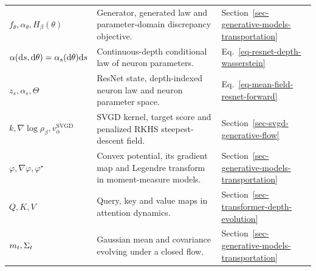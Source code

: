{\begin{longtable}{>{\raggedright\arraybackslash}p{}
                  >{\raggedright\arraybackslash}p{}
                  >{\raggedright\arraybackslash}p{}}
$f_\theta,\alpha_\theta,H_\beta(\theta)$ & Generator, generated law and parameter-domain discrepancy objective. & Section~\ref{sec-generative-models-transportation} \\
$\alpha(\mathrm{d} s,\mathrm{d}\theta)=\alpha_s(\mathrm{d}\theta)\mathrm{d} s$ & Continuous-depth conditional law of neuron parameters. & Eq.~\eqref{eq-resnet-depth-wasserstein} \\
$z_s,\alpha_s,\Theta$ & ResNet state, depth-indexed neuron law and neuron parameter space. & Eq.~\eqref{eq-mean-field-resnet-forward} \\
$k,\nabla\log\rho_\beta,v_\alpha^{\mathrm{SVGD}}$ & SVGD kernel, target score and penalized RKHS steepest-descent field. & Section~\ref{sec-svgd-generative-flow} \\
$\varphi,\nabla\varphi,\varphi^\star$ & Convex potential, its gradient map and Legendre transform in moment-measure models. & Section~\ref{sec-generative-models-transportation} \\
$Q,K,V$ & Query, key and value maps in attention dynamics. & Section~\ref{sec-transformer-depth-evolution} \\
$m_t,\Sigma_t$ & Gaussian mean and covariance evolving under a closed flow. & Section~\ref{sec-generative-models-transportation} \\
\end{longtable}
}
